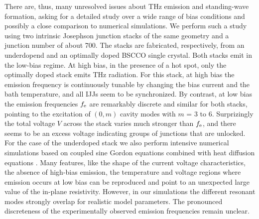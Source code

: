 \documentclass[aps,twocolumn,prb,showpacs,preprintnumbers,superscriptaddress,amsmath,amssymb,longbibliography]{revtex4-1}
\begin{document}
There are, thus, many unresolved issues about THz emission and standing-wave formation, asking for a detailed study over a wide range of bias conditions and possibly a close comparison to numerical simulations. We perform such a study using two intrinsic Josephson junction stacks of the same geometry and a junction number of about 700. The stacks are fabricated, respectively, from an underdopend and an optimally doped BSCCO single crystal. 
Both stacks emit in the low-bias regime. At high bias, in the presence of a hot spot, only the optimally doped stack emits THz radiation.
For this stack, at high bias the emission frequency is continuously tunable by changing the bias current and the bath temperature, and all IJJs seem to be synchronized. By contrast, at low bias the emission frequencies $f_{\rm e}$ are remarkably discrete and similar for both stacks, pointing to the excitation of $(0,m)$ cavity modes with $m$ = 3 to 6. Surprizingly the total voltage $V$ across the stack varies much stronger than $f_{\rm e}$, and there seems to be an excess voltage indicating groups of junctions that are unlocked. For the case of the underdoped stack we also perform intensive numerical simulations based on coupled sine Gordon equations combined with heat diffusion equations \cite{Rudau15, Rudau16,Sun18}. Many features, like the shape of the current voltage characteristics, the absence of high-bias emission, the temperature and voltage regions where emission occurs at low bias can be reproduced and point to an unexpected large value of the in-plane resistivity.  However, in our simulations the different resonant modes strongly overlap for realistic model parameters. The pronounced discreteness of the experimentally observed emission frequencies remain unclear.



\end{document}
